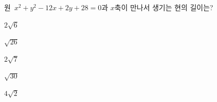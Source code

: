 원~$x^2+y^2-12x+2y+28=0$과 $x$축이 만나서 생기는 현의 길이는?
\begin{choices32}{\rule[-3ex]{0pt}{8ex}$2\sqrt{6}$}{\rule[-3ex]{0pt}{8ex}$\sqrt{26}$}{\rule[-3ex]{0pt}{8ex}$2\sqrt{7}$}{\rule[-3ex]{0pt}{8ex}$\sqrt{30}$}{\rule[-3ex]{0pt}{8ex}$4\sqrt{2}$}\end{choices32}
